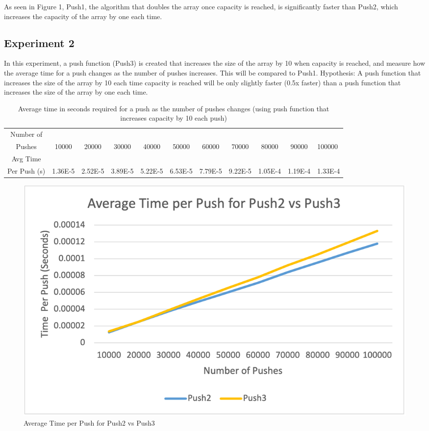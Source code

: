 \documentclass{article}
\begin{document}
As seen in Figure 1, Push1, the algorithm that doubles the array once capacity is reached, is significantly faster than Push2, which increases the capacity of the array by one each time. 

\subsection{Experiment 2}

In this experiment, a push function (Push3) is created that increases the size of the array by 10 when capacity is reached, and measure how the average time for a push changes as the number of pushes increases. This will be compared to Push1. 
Hypothesis: A push function that increases the size of the array by 10 each time capacity is reached will be only slightly faster (0.5x faster) than a push function that increases the size of the array by one each time.  

\begin{table}[h!]
\centering
\begin{tabular}{c|c|c|c|c|c|c|c|c|c|l}
Number of\\Pushes & 10000 & 20000 & 30000 & 40000 & 50000 & 60000 & 70000 & 80000 & 90000 & 100000 \\\hline
Avg Time\\Per Push (s) & 1.36E-5 & 2.52E-5 & 3.89E-5 & 5.22E-5 & 6.53E-5 & 7.79E-5 & 9.22E-5 & 1.05E-4 & 1.19E-4 & 1.33E-4 \\

\end{tabular}
\caption{\label{tab:widgets}Average time in seconds required for a push as the number of pushes changes (using push function that increases capacity by 10 each push)}
\end{table}

\pagebreak

\begin{figure}[h!]
  \includegraphics[width=\linewidth]{Figure2_0A.png}
  \caption{Average Time per Push for Push2 vs Push3}
  \label{fig:boat1}
\end{figure}
\end{document}

